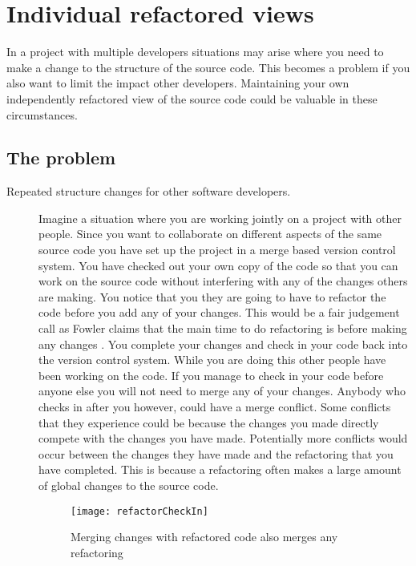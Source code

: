 
\chapter{Individual refactored views}

In a project with multiple developers situations may arise where you need to make a change to the structure of the source code. This becomes a problem if you also want to limit the impact other developers.  Maintaining your own independently refactored view of the source code could be valuable in these circumstances. 

\section{The problem}
\begin{description}
  \item [Repeated structure changes for other software developers.]   
    Imagine a situation where you are working jointly on a project with other people. Since you want to collaborate on different aspects of the same source code you have set up the project in a merge based version control system.  You have checked out your own copy of the code so that you can work on the source code without interfering with any of the changes others are making. You notice that you they are going to have to refactor the code before you add any of your changes.  This would be a fair judgement call as Fowler claims that the main time to do refactoring is before making any changes \cite{Fowler1999}. You complete your changes and check in your code back into the version control system.  While you are doing this other people have been working on the code.  If you manage to check in your code before anyone else you will not need to merge any of your changes.  Anybody who checks in after you however, could have a merge conflict.  Some conflicts that they experience could be because the changes you made directly compete with the changes you have made. Potentially more conflicts would occur between the changes they have made and the refactoring that you have completed. This is because a refactoring often makes a large amount of global changes to the source code.

    \begin{figure}
    \begin{center}
    \texttt{[image: refactorCheckIn]}
    \end{center}
    \caption{Merging changes with refactored code also merges any refactoring}
    \end{figure}


\end{description}
